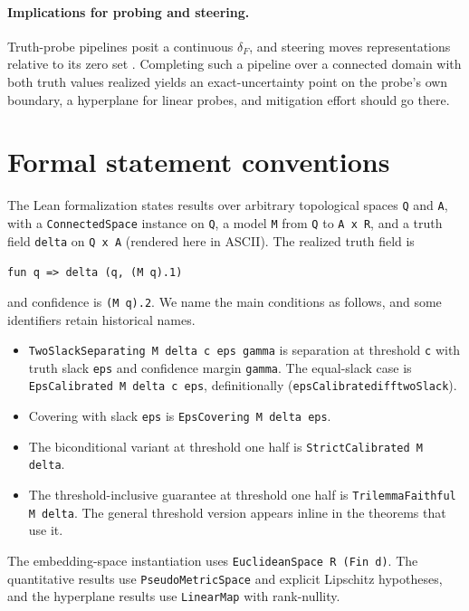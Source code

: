 \documentclass[mlmain,onecolumn]{jmlr}
\newcommand{\dF}{\delta_{\!F}}
\newcommand{\leanid}[1]{{\def\_{\textunderscore\allowbreak}\texttt{#1}}}
\begin{document}
\paragraph{Implications for probing and steering.}
Truth-probe pipelines posit a continuous $\dF$, and steering moves
representations relative to its zero set
\citep{li2023inference,zou2023representation}. Completing such a
pipeline over a connected domain with both truth values realized
yields an exact-uncertainty point on the probe's own boundary, a
hyperplane for linear probes, and mitigation effort should go
there.

\section{Formal statement conventions}
\label{app:conventions}

The Lean formalization states results over arbitrary topological
spaces \texttt{Q} and \texttt{A}, with a \texttt{ConnectedSpace}
instance on \texttt{Q}, a model \texttt{M} from \texttt{Q} to
\texttt{A x R}, and a truth field \texttt{delta} on \texttt{Q x A}
(rendered here in ASCII). The realized truth field is
\begin{center}
\texttt{fun q => delta (q, (M q).1)}
\end{center}
and confidence is \texttt{(M q).2}. We name the main conditions as
follows, and some identifiers retain historical names.

\begin{itemize}
\item \leanid{TwoSlackSeparating M delta c eps gamma} is separation
  at threshold \texttt{c} with truth slack \texttt{eps} and
  confidence margin \texttt{gamma}. The equal-slack case is
  \leanid{EpsCalibrated M delta c eps}, definitionally
  (\leanid{epsCalibrated\_iff\_twoSlack}).
\item Covering with slack \texttt{eps} is
  \leanid{EpsCovering M delta eps}.
\item The biconditional variant at threshold one half is
  \leanid{StrictCalibrated M delta}.
\item The threshold-inclusive guarantee at threshold one half is
  \leanid{TrilemmaFaithful M delta}. The general threshold version
  appears inline in the theorems that use it.
\end{itemize}

The embedding-space instantiation uses
\texttt{EuclideanSpace R (Fin d)}. The quantitative results use
\texttt{PseudoMetricSpace} and explicit Lipschitz hypotheses, and the
hyperplane results use \texttt{LinearMap} with rank-nullity.
\end{document}
